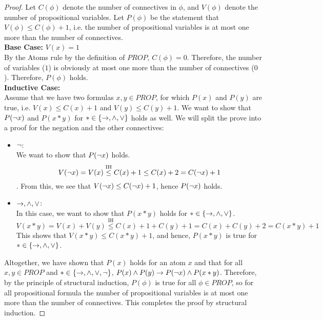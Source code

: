 \begin{solutions}
	\solution
	\begin{proof}
		Let $C(\phi)$ denote the number of connectives in $\phi$, and $V(\phi)$ denote the number of propositional variables. Let $P(\phi)$ be the statement that $V(\phi)\leq C(\phi)+1$, i.e. the number of propositional variables is at most one more than the number of connectives.\\
		\textbf{Base Case:} $V(x)=1$\\
		By the Atoms rule by the definition of $PROP$, $C(\phi)=0$. Therefore, the number of variables ($1$) is obviously at most one more than the number of connectives ($0$). Therefore, $P(\phi)$ holds.\\
		\textbf{Inductive Case:}\\
		Assume that we have two formulas $x,y\in PROP$, for which $P(x)$ and $P(y)$ are true, i.e. $V(x)\leq C(x)+1$ and $V(y)\leq C(y)+1$. We want to show that $P(\lnot x)$ and $P(x * y)$ for $*\in \{\rightarrow, \land, \lor\}$ holds as well. We will split the prove into a proof for the negation and the other connectives:
		\begin{itemize}
			\item $\lnot$:\\We want to show that $P(\lnot x)$ holds.
			\[V(\lnot x)=V(x)\overset{\text{IH}}\leq C(x)+1\leq C(x) + 2 = C(\lnot x) + 1\]. From this, we see that $V(\lnot x)\leq C(\lnot x) + 1$, hence $P(\lnot x)$ holds.
			\item $\rightarrow, \land, \lor$:\\
			In this case, we want to show that $P(x * y)$ holds for $*\in \{\rightarrow, \land, \lor\}$. \[V(x * y)=V(x) + V(y)\overset{\text{IH}}\leq C(x) + 1 + C(y) + 1=C(x)+C(y)+2=C(x*y) + 1\] This shows that $V(x*y)\leq C(x*y)+1$, and hence, $P(x*y)$ is true for $*\in \{\rightarrow, \land, \lor\}$.
		\end{itemize}
		
		Altogether, we have shown that $P(x)$ holds for an atom $x$ and that for all $x,y\in PROP$ and $*\in \{\rightarrow, \land, \lor, \lnot\}$, $P(x)\land P(y)\rightarrow P(\lnot x)\land P(x*y)$. Therefore, by the principle of structural induction, $P(\phi)$ is true for all $\phi\in PROP$, so for all propositional formula the number of propositional variables is at most one more than the number of connectives. This completes the proof by structural induction.
	\end{proof}
\end{solutions}


